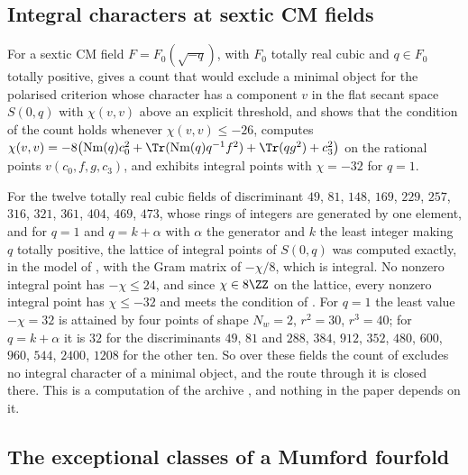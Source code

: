 \subsection{Integral characters at sextic CM fields}\label{ssec:sexticfields}

For a sextic CM field $F=F_{0}(\sqrt{-q})$, with $F_{0}$ totally real cubic and $q\in F_{0}$ totally positive, \cite[Prop.~19.47]{BMB26} gives a count that would exclude a minimal object for the polarised criterion whose character has a component $v$ in the flat secant space $S(0,q)$ with $\chi(v,v)$ above an explicit threshold, and \cite[Prop.~19.49]{BMB26} shows that the condition of the count holds whenever $\chi(v,v)\le-26$, computes $\chi(v,v)=-8\bigl(\mathrm{Nm}(q)c_{0}^{2}+\Tr(\mathrm{Nm}(q)q^{-1}f^{2})+\Tr(qg^{2})+c_{3}^{2}\bigr)$ on the rational points $v(c_{0},f,g,c_{3})$, and exhibits integral points with $\chi=-32$ for $q=1$.

\begin{remark}\label{rem:sexticfields}
For the twelve totally real cubic fields of discriminant $49$, $81$, $148$, $169$, $229$, $257$, $316$, $321$, $361$, $404$, $469$, $473$, whose rings of integers are generated by one element, and for $q=1$ and $q=k+\alpha$ with $\alpha$ the generator and $k$ the least integer making $q$ totally positive, the lattice of integral points of $S(0,q)$ was computed exactly, in the model of \cite[Prop.~19.49]{BMB26}, with the Gram matrix of $-\chi/8$, which is integral. No nonzero integral point has $-\chi\le24$, and since $\chi\in8\ZZ$ on the lattice, every nonzero integral point has $\chi\le-32$ and meets the condition of \cite[Prop.~19.47(iii)]{BMB26}. For $q=1$ the least value $-\chi=32$ is attained by four points of shape $N_{w}=2$, $r^{2}=30$, $r^{3}=40$; for $q=k+\alpha$ it is $32$ for the discriminants $49$, $81$ and $288$, $384$, $912$, $352$, $480$, $600$, $960$, $544$, $2400$, $1208$ for the other ten. So over these fields the count of \cite[Prop.~19.47]{BMB26} excludes no integral character of a minimal object, and the route through it is closed there. This is a computation of the archive \cite{BB26code}, and nothing in the paper depends on it.
\end{remark}

\subsection{The exceptional classes of a Mumford fourfold}\label{ssec:mumford}

